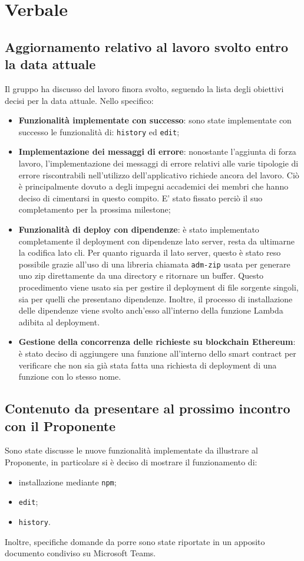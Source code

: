 \section{Verbale}

	\subsection{Aggiornamento relativo al lavoro svolto entro la data attuale}
	Il gruppo ha discusso del lavoro finora svolto, seguendo la lista degli obiettivi decisi per la data attuale. Nello specifico:
	\begin{itemize}
		\item \textbf{Funzionalità implementate con successo}: sono state implementate con successo le funzionalità di: \texttt{history} ed \texttt{edit}; 
		\item \textbf{Implementazione dei messaggi di errore}: nonostante l'aggiunta di forza lavoro, l'implementazione dei messaggi di errore relativi alle varie tipologie di errore riscontrabili nell'utilizzo dell'applicativo richiede ancora del lavoro. Ciò è principalmente dovuto a degli impegni accademici dei membri che hanno deciso di cimentarsi in questo compito. E' stato fissato perciò il suo completamento per la prossima milestone\textit{};
		\item \textbf{Funzionalità di deploy con dipendenze}: è stato implementato completamente il deployment\textit{} con dipendenze lato server, resta da ultimarne la codifica lato cli\textit{}. Per quanto riguarda il lato server, questo è stato reso possibile grazie all'uso di una libreria chiamata \texttt{adm-zip} usata per generare uno zip direttamente da una directory e ritornare un buffer. Questo procedimento viene usato sia per gestire il deployment\textit{} di file sorgente singoli, sia per quelli che presentano dipendenze. Inoltre, il processo di installazione delle dipendenze viene svolto anch'esso all'interno della funzione Lambda\textit{} adibita al deployment.
		\item \textbf{Gestione della concorrenza delle richieste su blockchain\textit{} Ethereum\textit{}}: è stato deciso di aggiungere una funzione all'interno dello smart contract\textit{} per verificare che non sia già stata fatta una richiesta di deployment\textit{} di una funzione con lo stesso nome.
	\end{itemize}
	\subsection{Contenuto da presentare al prossimo incontro con il Proponente}
		Sono state discusse le nuove funzionalità implementate da illustrare al Proponente\textit{}, in particolare si è deciso di mostrare il funzionamento di:
		\begin{itemize}
			\item installazione mediante \texttt{npm};
			\item \texttt{edit};
			\item \texttt{history}.
		\end{itemize}
Inoltre, specifiche domande da porre sono state riportate in un apposito documento condiviso su Microsoft Teams\textit{}.

